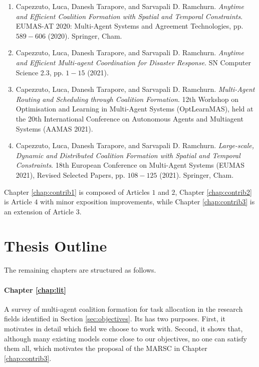 \begin{enumerate}
    \item Capezzuto, Luca, Danesh Tarapore, and Sarvapali D. Ramchurn.
        \emph{Anytime and Efficient Coalition Formation with Spatial and Temporal
        Constraints}. EUMAS-AT 2020: Multi-Agent Systems and Agreement Technologies, pp.
        $589 - 606$ (2020). Springer, Cham.
    \item Capezzuto, Luca, Danesh Tarapore, and Sarvapali D. Ramchurn.
        \emph{Anytime and Efficient Multi-agent Coordination for Disaster Response}. SN
        Computer Science 2.3, pp. $1 - 15$ (2021).
    \item Capezzuto, Luca, Danesh Tarapore, and Sarvapali D. Ramchurn.
        \emph{Multi-Agent Routing and Scheduling through Coalition Formation}. 12th
        Workshop on Optimisation and Learning in Multi-Agent Systems (OptLearnMAS), held
        at the 20th International Conference on Autonomous Agents and Multiagent Systems
        (AAMAS 2021).
    \item Capezzuto, Luca, Danesh Tarapore, and Sarvapali D. Ramchurn.
        \emph{Large-scale, Dynamic and Distributed Coalition Formation with Spatial and
        Temporal Constraints}. 18th European Conference on Multi-Agent Systems (EUMAS
        2021), Revised Selected Papers, pp. $108 - 125$ (2021). Springer, Cham.
\end{enumerate}

Chapter \ref{chap:contrib1} is composed of Articles $1$ and $2$, Chapter
\ref{chap:contrib2} is Article $4$ with minor exposition improvements, while Chapter
\ref{chap:contrib3} is an extension of Article $3$.

\section{Thesis Outline}\label{sec:outline}

The remaining chapters are structured as follows.

\paragraph{Chapter \ref{chap:lit}}
A survey of multi-agent coalition formation for task allocation in the research fields
identified in Section \ref{sec:objectives}.
Its has two purposes. First, it motivates in detail which field we choose to work with.
Second, it shows that, although many existing models come close to our objectives, no one
can satisfy them all, which motivates the proposal of the MARSC in Chapter
\ref{chap:contrib3}.

